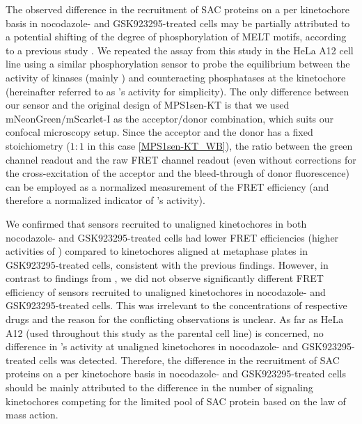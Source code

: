 The observed difference in the recruitment of SAC proteins on a per kinetochore basis in nocodazole- and GSK923295-treated cells may be partially attributed to a potential shifting of the degree of phosphorylation of MELT motifs, according to a previous study \cite{MPS1senor}. We repeated the assay from this study in the HeLa A12 cell line using a similar phosphorylation sensor to probe the equilibrium between the activity of kinases (mainly ) and counteracting phosphatases at the kinetochore (hereinafter referred to as 's activity for simplicity). The only difference between our sensor and the original design of MPS1sen-KT is that we used mNeonGreen/mScarlet-I as the acceptor/donor combination, which suits our confocal microscopy setup.
Since the acceptor and the donor has a fixed stoichiometry ($1 : 1$ in this case \ref{MPS1sen-KT_WB}),
the ratio between the green channel readout and the raw FRET channel readout (even without corrections for the cross-excitation of the acceptor and the bleed-through of donor fluorescence) can be employed as a normalized measurement of the FRET efficiency (and therefore a normalized indicator of 's activity).

We confirmed that sensors recruited to unaligned kinetochores in both nocodazole- and GSK923295-treated cells had lower FRET efficiencies (higher activities of ) compared to kinetochores aligned at metaphase plates in GSK923295-treated cells, consistent with the previous findings. However, in contrast to findings from \cite{MPS1senor}, we did not observe significantly different FRET efficiency of sensors recruited to unaligned kinetochores in nocodazole- and GSK923295-treated cells. This was irrelevant to the concentrations of respective drugs and the reason for the conflicting observations is unclear. As far as HeLa A12 (used throughout this study as the parental cell line) is concerned, no difference in 's activity at unaligned kinetochores in nocodazole- and GSK923295-treated cells was detected. Therefore, the difference in the recruitment of SAC proteins on a per kinetochore basis in nocodazole- and GSK923295-treated cells should be mainly attributed to the difference in the number of signaling kinetochores competing for the limited pool of SAC protein based on the law of mass action.


